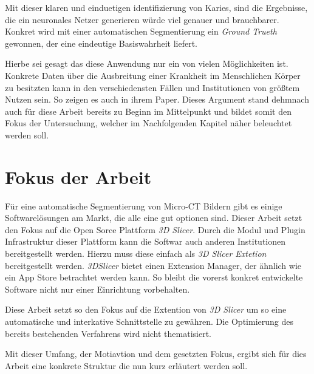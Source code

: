 Mit dieser klaren und einduetigen identifizierung von Karies, sind die
Ergebnisse, die ein neuronales Netzer generieren würde viel genauer und brauchbarer.
Konkret wird mit einer automatischen Segmentierung ein \textit{Ground Trueth} gewonnen,
der eine eindeutige Basiswahrheit liefert.

Hierbe sei gesagt das diese Anwendung nur ein von vielen Möglichkeiten ist. Konkrete
Daten über die Ausbreitung einer Krankheit im Menschlichen Körper zu besitzten kann
in den verschiedensten Fällen und Institutionen von größtem Nutzen sein. So
zeigen es auch \citet{de20083d} in ihrem Paper. Dieses Argument stand dehmnach
auch für diese Arbeit bereits zu Beginn im Mittelpunkt und bildet somit den
Fokus der Untersuchung, welcher im Nachfolgenden Kapitel näher beleuchtet werden
soll.

\section{Fokus der Arbeit}
\label{sec:fokus_der-arbeit} Für eine automatische Segmentierung von Micro-CT Bildern
gibt es einige Softwarelösungen am Markt, die alle eine gut optionen sind. Dieser
Arbeit setzt den Fokus auf die Open Sorce Plattform \textit{3D Slicer}. Durch die
Modul und Plugin Infrastruktur dieser Plattform kann die Softwar auch anderen Institutionen
bereitgestellt werden. Hierzu muss diese einfach als \textit{3D Slicer Extetion}
bereitgestellt werden. \textit{3DSlicer} bietet einen Extension Manager, der
ähnlich wie ein App Store betrachtet werden kann. So bleibt die vorerst konkret entwickelte
Software nicht nur einer Einrichtung vorbehalten.

Diese Arbeit setzt so den Fokus auf die Extention von \textit{3D Slicer} um so
eine automatische und interkative Schnittstelle zu gewähren. Die Optimierung des
bereits bestehenden Verfahrens wird nicht thematisiert.

Mit dieser Umfang, der Motiavtion und dem gesetzten Fokus, ergibt sich für dies Arbeit
eine konkrete Struktur die nun kurz erläutert werden soll.

